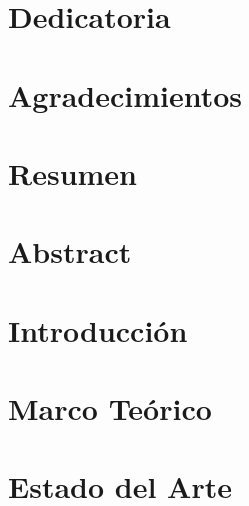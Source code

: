 \documentclass[12pt, twoside, openany]{book}
\begin{document}
    \chapter*{\centering Dedicatoria}
    \label{chap:dedication}
    

    \chapter*{\centering Agradecimientos}
    \label{chap:acknowledgments}
    

    \chapter*{\centering Resumen}
    \label{chap:resumen}
    

    \chapter*{\centering Abstract}
    \label{chap:abstract}
    

    \tableofcontents
    \printglossaries \listoftables \listoffigures

    \mainmatter

    \newpage

    \chapter{Introducción}
    \label{chap:intro}
    

    \chapter{Marco Teórico}
    \label{chap:theory}
    

    \chapter{Estado del Arte}
    \label{chap:state_of_art}
    

\end{document}
